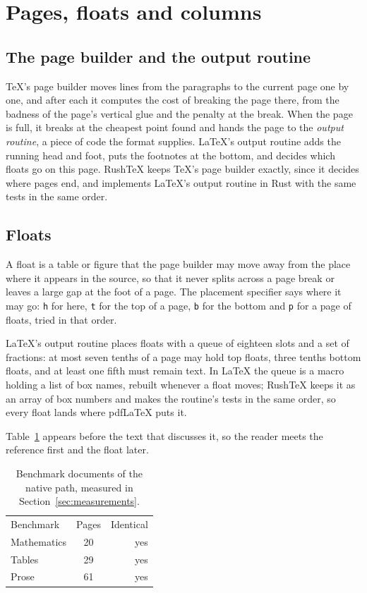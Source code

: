 \documentclass{article}
\numberwithin{equation}{section}
\theoremstyle{definition}
\theoremstyle{remark}
\begin{document}
\section{Pages, floats and columns}\label{sec:floats}

\subsection{The page builder and the output routine}

\TeX's page builder moves lines from the paragraphs to the current page one by one, and
after each it computes the cost of breaking the page there, from the badness of the
page's vertical glue and the penalty at the break. When the page is full, it breaks at
the cheapest point found and hands the page to the \emph{output routine}, a piece of
code the format supplies. \LaTeX's output routine adds the running head and foot, puts
the footnotes at the bottom, and decides which floats go on this page. RushTeX keeps
\TeX's page builder exactly, since it decides where pages end, and implements \LaTeX's
output routine in Rust with the same tests in the same order.

\subsection{Floats}

A float is a table or figure that the page builder may move away from the place where
it appears in the source, so that it never splits across a page break or leaves a large
gap at the foot of a page. The placement specifier says where it may go: \texttt{h} for
here, \texttt{t} for the top of a page, \texttt{b} for the bottom and \texttt{p} for a
page of floats, tried in that order.

\LaTeX's output routine places floats with a queue of eighteen slots and a set of
fractions: at most seven tenths of a page may hold top floats, three tenths bottom
floats, and at least one fifth must remain text. In \LaTeX{} the queue is a macro
holding a list of box names, rebuilt whenever a float moves; RushTeX keeps it as an
array of box numbers and makes the routine's tests in the same order, so every float
lands where pdfLaTeX puts it.

Table~\ref{tab:results} appears before the text that discusses it, so the reader meets
the reference first and the float later.

\begin{table}[h]
\centering
\begin{tabular}{l c r}
Benchmark & Pages & Identical \\
Mathematics & 20 & yes \\
Tables & 29 & yes \\
Prose & 61 & yes \\
\end{tabular}
\caption[Benchmark documents of the native path]{Benchmark documents of the native path, measured in
Section~\ref{sec:measurements}.}\label{tab:results}
\end{table}
\end{document}
